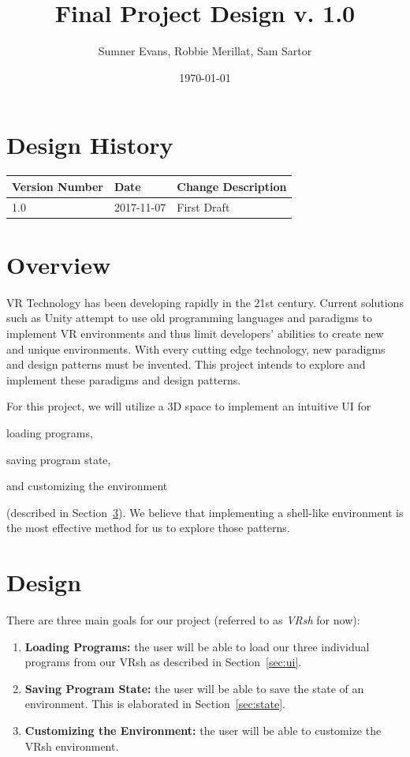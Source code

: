 \documentclass[titlepage,12pt]{article}
\title{Final Project Design v. 1.0}
\author{Sumner Evans, Robbie Merillat, Sam Sartor}
\date{\today}
\newcommand\name{VRsh\xspace}
\begin{document}
\maketitle

\section{Design History}
\begin{tabularx}{\linewidth}{| l | l || X |}
    \hline
    \textbf{Version Number} & \textbf{Date} & \textbf{Change Description} \\
    \hline\hline
    1.0 & 2017-11-07 & First Draft \\
    \hline
\end{tabularx}

\section{Overview}
VR Technology has been developing rapidly in the 21st century. Current solutions
such as Unity attempt to use old programming languages and paradigms to
implement VR environments and thus limit developers' abilities to create new and
unique environments. With every cutting edge technology, new paradigms and
design patterns must be invented. This project intends to explore and implement
these paradigms and design patterns.

For this project, we will utilize a 3D space to implement an intuitive UI for
\begin{enumerate*}
\item loading programs,
\item saving program state,
\item and customizing the environment
\end{enumerate*} (described in Section~\ref{sec:design}).  We believe that
implementing a shell-like environment is the most effective method for us to
explore those patterns.

\section{Design}\label{sec:design}
There are three main goals for our project (referred to as \textit{\name} for
now):
\begin{enumerate}
    \item \textbf{Loading Programs:} the user will be able to load our three
        individual programs from our \name as described in Section~\ref{sec:ui}.
    \item \textbf{Saving Program State:} the user will be able to save the state
        of an environment. This is elaborated in Section~\ref{sec:state}.
    \item \textbf{Customizing the Environment:} the user will be able to
        customize the \name environment.
\end{enumerate}
\end{document}
